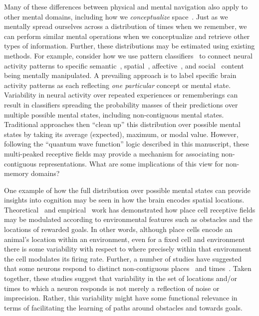 \documentclass{article}
\begin{document}
Many of these differences between physical and mental navigation also apply to other mental domains, including how we \textit{conceptualize} space~\citep[e.g., when we trace out a potential route in our mind;][]{GautvanW16, GautEtal18, ArzyScha19}.  Just as we mentally spread ourselves across a distribution of times when we remember, we can perform similar mental operations when we conceptualize and retrieve other types of information.  Further, these distributions may be estimated using existing methods.  For example, consider how we use pattern classifiers~\citep{NormEtal06b} to connect neural activity patterns to specific semantic~\citep{PolyEtal05a, MitcEtal08a, MannEtal12}, spatial~\citep{MillEtal13}, affective~\citep{ChanEtal18}, and social~\citep{MeyeEtal18} content being mentally manipulated.  A prevailing approach is to label specific brain activity patterns as each reflecting \textit{one particular} concept or mental state.  Variability in neural activity over repeated experiences or rememberings can result in classifiers spreading the probability masses of their predictions over multiple possible mental states, including non-contiguous mental states.  Traditional approaches then ``clean up'' this distribution over possible mental states by taking its average (expected), maximum, or modal value.  However, following the ``quantum wave function'' logic described in this manuscript, these multi-peaked receptive fields may provide a mechanism for associating non-contiguous representations.  What are some implications of this view for non-memory domains?

One example of how the full distribution over possible mental states can provide insights into cognition may be seen in how the brain encodes spatial locations.  Theoretical~\citep[e.g., ][]{GersAbbo97} and empirical~\citep[e.g., ][]{PfeiFost13} work has demonstrated how place cell receptive fields may be modulated according to environmental features such as obstacles and the locations of rewarded goals.  In other words, although place cells encode an animal's location within an environment, even for a fixed cell and environment there is some variability with respect to where precisely within that environment the cell modulates its firing rate.  Further, a number of studies have suggested that some neurons respond to distinct non-contiguous places~\citep{FentEtal08, RichEtal14b, LeeEtal19, DerdEtal09, GrieEtal20} and times~\citep{PastEtal08}.  Taken together, these studies suggest that variability in the set of locations and/or times to which a neuron responds is not merely a reflection of noise or imprecision.  Rather, this variability might have some functional relevance in terms of facilitating the learning of paths around obstacles and towards goals.
\end{document}
